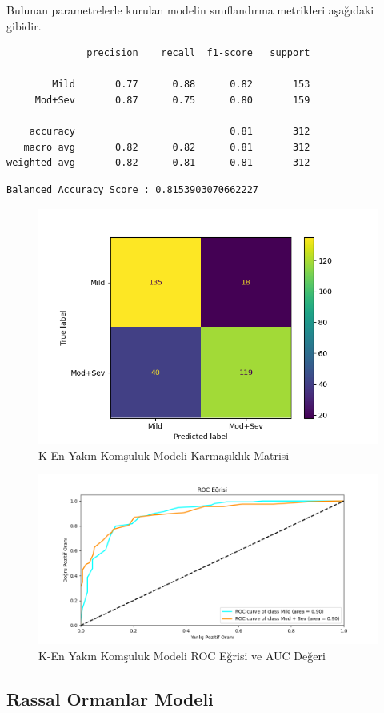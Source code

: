 \documentclass[12pt,twoside]{deuthesis}
\begin{document}
Bulunan parametrelerle kurulan modelin sınıflandırma metrikleri aşağıdaki gibidir.
\begin{verbatim}
              precision    recall  f1-score   support

        Mild       0.77      0.88      0.82       153
     Mod+Sev       0.87      0.75      0.80       159

    accuracy                           0.81       312
   macro avg       0.82      0.82      0.81       312
weighted avg       0.82      0.81      0.81       312
\end{verbatim}
\begin{verbatim}
Balanced Accuracy Score : 0.8153903070662227
\end{verbatim}
\begin{figure}

{\centering \includegraphics[width=1.05\linewidth,height=0.6\textheight]{figure/knn_bin_conf} 

}

\caption{K-En Yakın Komşuluk Modeli Karmaşıklık Matrisi}\label{fig:unnamed-chunk-52}
\end{figure}
\begin{figure}

{\centering \includegraphics[width=1.05\linewidth,height=0.6\textheight]{figure/KNeighborsClassifier_binary_roc} 

}

\caption{K-En Yakın Komşuluk Modeli ROC Eğrisi ve AUC Değeri}\label{fig:unnamed-chunk-53}
\end{figure}
\hypertarget{bin_rf}{%
\subsection{Rassal Ormanlar Modeli}\label{bin_rf}}
\end{document}
